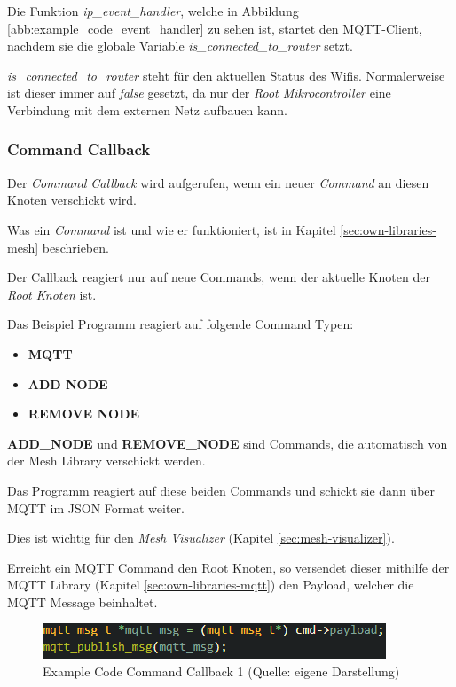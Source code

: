 Die Funktion \textit{ip\_event\_handler}, welche in Abbildung \ref{abb:example_code_event_handler} zu sehen ist, startet den MQTT-Client, nachdem sie die globale Variable \textit{is\_connected\_to\_router} setzt.

\textit{is\_connected\_to\_router} steht für den aktuellen Status des Wifis. Normalerweise ist dieser immer auf \textit{false} gesetzt, da nur der \textit{Root Mikrocontroller} eine Verbindung mit dem externen Netz aufbauen kann.

\subsubsection{Command Callback}

Der \textit{Command Callback} wird aufgerufen, wenn ein neuer \textit{Command} an diesen Knoten verschickt wird.

Was ein \textit{Command} ist und wie er funktioniert, ist in Kapitel \ref{sec:own-libraries-mesh} beschrieben.

Der Callback reagiert nur auf neue Commands, wenn der aktuelle Knoten der \textit{Root Knoten} ist.

Das Beispiel Programm reagiert auf folgende Command Typen:

\begin{itemize}
    \item \textbf{MQTT}
    \item \textbf{ADD NODE}
    \item \textbf{REMOVE NODE}
\end{itemize}

\textbf{ADD\_NODE} und \textbf{REMOVE\_NODE} sind Commands, die automatisch von der Mesh Library verschickt werden.

Das Programm reagiert auf diese beiden Commands und schickt sie dann über MQTT im JSON Format weiter.

Dies ist wichtig für den \textit{Mesh Visualizer} (Kapitel \ref{sec:mesh-visualizer}).

Erreicht ein MQTT Command den Root Knoten, so versendet dieser mithilfe der MQTT Library (Kapitel \ref{sec:own-libraries-mqtt}) den Payload, welcher die MQTT Message beinhaltet.

\begin{figure}[H]
    \begin{center}
        \includegraphics[scale=0.8]{images/example_code_on_cmd_one.png}
        \caption{Example Code Command Callback 1 (Quelle: eigene Darstellung)}
        \label{abb:example_code_on_cmd_one}
    \end{center}
\end{figure}

